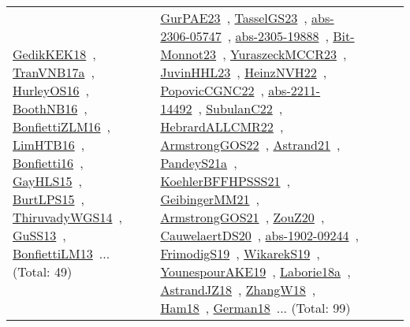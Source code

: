 {\begin{longtable}{lp{3cm}>{\raggedright\arraybackslash}p{6cm}>{\raggedright\arraybackslash}p{6cm}>{\raggedright\arraybackslash}p{8cm}}
\href{works/GedikKEK18.pdf}{GedikKEK18}~\cite{GedikKEK18}, \href{works/TranVNB17a.pdf}{TranVNB17a}~\cite{TranVNB17a}, \href{works/HurleyOS16.pdf}{HurleyOS16}~\cite{HurleyOS16}, \href{works/BoothNB16.pdf}{BoothNB16}~\cite{BoothNB16}, \href{works/BonfiettiZLM16.pdf}{BonfiettiZLM16}~\cite{BonfiettiZLM16}, \href{works/LimHTB16.pdf}{LimHTB16}~\cite{LimHTB16}, \href{works/Bonfietti16.pdf}{Bonfietti16}~\cite{Bonfietti16}, \href{works/GayHLS15.pdf}{GayHLS15}~\cite{GayHLS15}, \href{works/BurtLPS15.pdf}{BurtLPS15}~\cite{BurtLPS15}, \href{works/ThiruvadyWGS14.pdf}{ThiruvadyWGS14}~\cite{ThiruvadyWGS14}, \href{works/GuSS13.pdf}{GuSS13}~\cite{GuSS13}, \href{works/BonfiettiLM13.pdf}{BonfiettiLM13}~\cite{BonfiettiLM13}... (Total: 49) & \href{works/GurPAE23.pdf}{GurPAE23}~\cite{GurPAE23}, \href{works/TasselGS23.pdf}{TasselGS23}~\cite{TasselGS23}, \href{works/abs-2306-05747.pdf}{abs-2306-05747}~\cite{abs-2306-05747}, \href{works/abs-2305-19888.pdf}{abs-2305-19888}~\cite{abs-2305-19888}, \href{works/Bit-Monnot23.pdf}{Bit-Monnot23}~\cite{Bit-Monnot23}, \href{works/YuraszeckMCCR23.pdf}{YuraszeckMCCR23}~\cite{YuraszeckMCCR23}, \href{works/JuvinHHL23.pdf}{JuvinHHL23}~\cite{JuvinHHL23}, \href{works/HeinzNVH22.pdf}{HeinzNVH22}~\cite{HeinzNVH22}, \href{works/PopovicCGNC22.pdf}{PopovicCGNC22}~\cite{PopovicCGNC22}, \href{works/abs-2211-14492.pdf}{abs-2211-14492}~\cite{abs-2211-14492}, \href{works/SubulanC22.pdf}{SubulanC22}~\cite{SubulanC22}, \href{works/HebrardALLCMR22.pdf}{HebrardALLCMR22}~\cite{HebrardALLCMR22}, \href{works/ArmstrongGOS22.pdf}{ArmstrongGOS22}~\cite{ArmstrongGOS22}, \href{works/Astrand21.pdf}{Astrand21}~\cite{Astrand21}, \href{works/PandeyS21a.pdf}{PandeyS21a}~\cite{PandeyS21a}, \href{works/KoehlerBFFHPSSS21.pdf}{KoehlerBFFHPSSS21}~\cite{KoehlerBFFHPSSS21}, \href{works/GeibingerMM21.pdf}{GeibingerMM21}~\cite{GeibingerMM21}, \href{works/ArmstrongGOS21.pdf}{ArmstrongGOS21}~\cite{ArmstrongGOS21}, \href{works/ZouZ20.pdf}{ZouZ20}~\cite{ZouZ20}, \href{works/CauwelaertDS20.pdf}{CauwelaertDS20}~\cite{CauwelaertDS20}, \href{works/abs-1902-09244.pdf}{abs-1902-09244}~\cite{abs-1902-09244}, \href{works/FrimodigS19.pdf}{FrimodigS19}~\cite{FrimodigS19}, \href{works/WikarekS19.pdf}{WikarekS19}~\cite{WikarekS19}, \href{works/YounespourAKE19.pdf}{YounespourAKE19}~\cite{YounespourAKE19}, \href{works/Laborie18a.pdf}{Laborie18a}~\cite{Laborie18a}, \href{works/AstrandJZ18.pdf}{AstrandJZ18}~\cite{AstrandJZ18}, \href{works/ZhangW18.pdf}{ZhangW18}~\cite{ZhangW18}, \href{works/Ham18.pdf}{Ham18}~\cite{Ham18}, \href{works/German18.pdf}{German18}~\cite{German18}... (Total: 99)\\

\end{longtable}}
